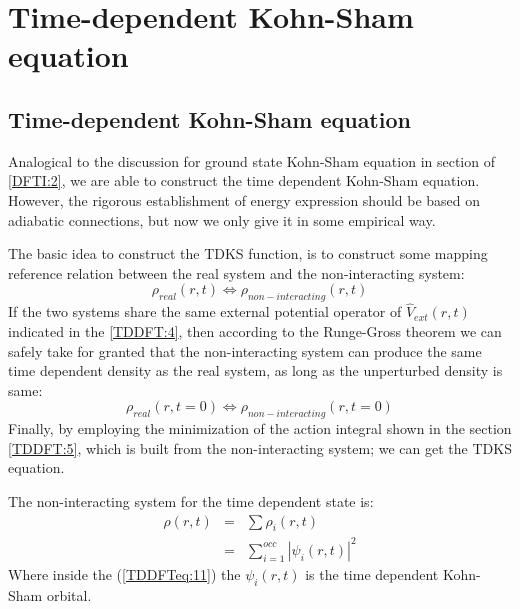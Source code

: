 \section{Time-dependent Kohn-Sham equation}
%
%
%
%

\subsection{Time-dependent Kohn-Sham equation}
%
%
Analogical to the discussion for ground state Kohn-Sham equation in
section of \ref{DFTI:2}, we are able to construct the time dependent
Kohn-Sham equation. However, the rigorous establishment of energy
expression should be based on adiabatic connections, but now we only
give it in some empirical way. 

The basic idea to construct the TDKS function, is to construct some
mapping reference relation between the real system and the
non-interacting system:
\begin{equation}\label{}
\rho_{real}(r,t) \Leftrightarrow \rho_{non-interacting}(r,t)
\end{equation}
If the two systems share the same external potential operator of
$\hat{V}_{ext}(r,t)$ indicated in the \ref{TDDFT:4}, then according
to the Runge-Gross theorem we can safely take for granted that the
non-interacting system can produce the same time dependent density
as the real system, as long as the unperturbed density is same:
\begin{equation}\label{}
\rho_{real}(r,t = 0) \Leftrightarrow \rho_{non-interacting}(r,t = 0)
\end{equation}
Finally, by employing the minimization of the action integral shown
in the section \ref{TDDFT:5}, which is built from the
non-interacting system; we can get the TDKS equation.

The non-interacting system for the time dependent state is:
\begin{eqnarray}\label{TDDFTeq:11}
  \rho(r,t) &=& \sum\rho_{i}(r,t) \nonumber \\
            &=& \sum_{i=1}^{occ}|\psi_{i}(r,t)|^{2}
\end{eqnarray}
Where inside the (\ref{TDDFTeq:11}) the $\psi_{i}(r,t)$ is the time
dependent Kohn-Sham orbital.

